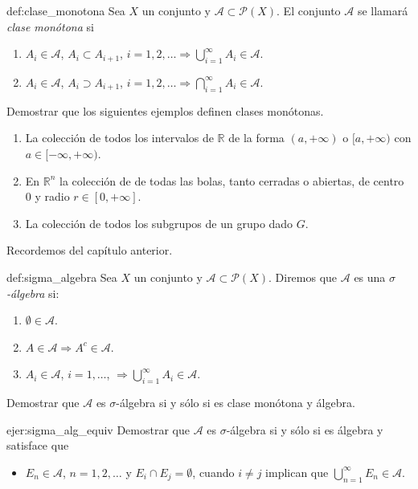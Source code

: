 \begin{definicion}{def:clase_monotona} 
 Sea $X$ un conjunto y $\mathscr{A}\subset\mathcal{P}(X)$. El conjunto $\mathscr{A}$ se llamará   \emph{clase monótona} si
 \begin{enumerate}
  \item $A_i\in\mathscr{A}$, $A_i\subset A_{i+1}$, $i=1,2,\ldots\Rightarrow \bigcup\limits_{i=1}^{\infty}A_i\in\mathscr{A}$. 
    \item $A_i\in\mathscr{A}$, $A_i\supset A_{i+1}$, $i=1,2,\ldots\Rightarrow \bigcap\limits_{i=1}^{\infty}A_i\in\mathscr{A}$. 
 \end{enumerate}

\end{definicion}

\begin{ejercicio}{} Demostrar que los siguientes ejemplos definen clases monótonas.
 \begin{enumerate}
  \item La colección de todos los intervalos de $\mathbb{R}$ de la forma $(a,+\infty)$ o $[a,+\infty)$ con $a\in [-\infty,+\infty)$.
  \item En $\mathbb{R}^n$ la colección de de todas las bolas, tanto cerradas o abiertas, de centro $0$ y radio $r\in[0,+\infty]$. 
  \item La colección de todos los subgrupos de un grupo dado $G$. 
 \end{enumerate}
\end{ejercicio}

Recordemos del capítulo anterior.
\begin{definicion}{def:sigma_algebra} 
 Sea $X$ un conjunto y $\mathscr{A}\subset \mathcal{P}(X)$. Diremos que $\mathscr{A}$ es una \emph{$\sigma$-álgebra} si:
 \begin{enumerate}
  \item $\emptyset\in\mathscr{A}$.
  \item $A\in\mathscr{A}\Rightarrow A^c\in\mathscr{A}$.
  \item $A_i\in\mathscr{A}$, $i=1,\ldots$, $\Rightarrow\bigcup\limits_{i=1}^{\infty}A_i\in\mathscr{A}$.
 \end{enumerate}

\end{definicion}


\begin{ejercicio}{} Demostrar que  $\mathscr{A}$ es $\sigma$-álgebra si y sólo si es clase monótona y álgebra.
 
\end{ejercicio}
\begin{ejercicio}{ejer:sigma_alg_equiv} Demostrar que  $\mathscr{A}$ es $\sigma$-álgebra si y sólo si es álgebra y satisface que 
\begin{itemize}
 \item $E_n\in\mathscr{A}$, $n=1,2,\ldots$ y $E_i\cap E_j=\emptyset$, cuando $i\neq j$ implican que $\bigcup\limits_{n=1}^{\infty} E_n\in\mathscr{A}$.
\end{itemize}
\end{ejercicio}


